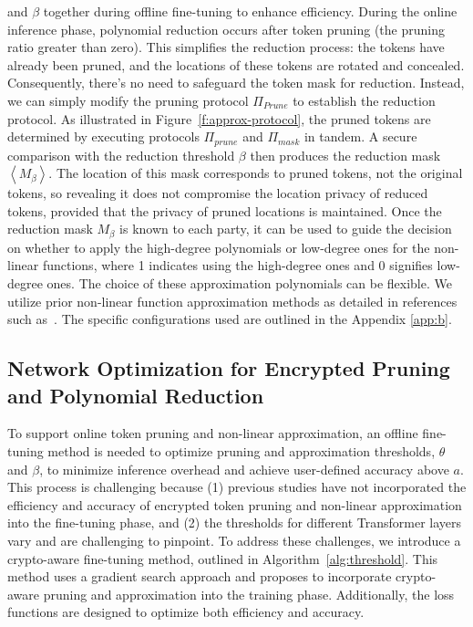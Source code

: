 and $\beta$ together during offline fine-tuning to enhance efficiency. During the online inference phase, polynomial reduction occurs after token pruning (the pruning ratio {greater} than zero). This simplifies the reduction process: the tokens have already been pruned, and the locations of these tokens are rotated and concealed. Consequently, there's no need to safeguard the token mask for reduction. Instead, we can simply modify the pruning protocol $\Pi_{Prune}$ to establish the reduction protocol. As illustrated in Figure~\ref{f:approx-protocol}, the pruned tokens are determined by executing protocols $\Pi_{prune}$ and $\Pi_{mask}$ in tandem. A secure comparison with the reduction threshold $\beta$ then produces the reduction mask $\left \langle M_{\beta} \right \rangle$. The location of this mask corresponds to pruned tokens, not the original tokens, so revealing it does not compromise the location privacy of reduced tokens, provided that the privacy of pruned locations is maintained. Once the reduction mask $M_{\beta}$ is known to each party, it can be used to guide the decision on whether to apply the high-degree polynomials or low-degree ones for the non-linear functions, where 1 indicates using the high-degree ones and 0 signifies low-degree ones. The choice of these approximation polynomials can be flexible. We utilize prior non-linear function approximation methods as detailed in references such as~\citep{kim2021ibert, lu2023bumblebee, pang2023bolt}. The specific configurations used are outlined in the Appendix \ref{app:b}.

\vspace{0.1in}
\subsection{Network Optimization for Encrypted Pruning and Polynomial Reduction}
\label{sec:finetune}

To support online token pruning and non-linear approximation, an offline fine-tuning method is needed to optimize pruning and approximation thresholds, $\theta$ and $\beta$, to minimize inference overhead and achieve user-defined accuracy above $a$. This process is challenging because (1) previous studies have not incorporated the efficiency and accuracy of encrypted token pruning and non-linear approximation into the fine-tuning phase, and (2) the thresholds for different Transformer layers vary and are challenging to pinpoint. To address these challenges, we introduce a crypto-aware fine-tuning method, outlined in Algorithm~\ref{alg:threshold}. This method uses a gradient search approach and proposes to incorporate crypto-aware pruning and approximation into the training phase. Additionally, the loss functions are designed to optimize both efficiency and accuracy. 



